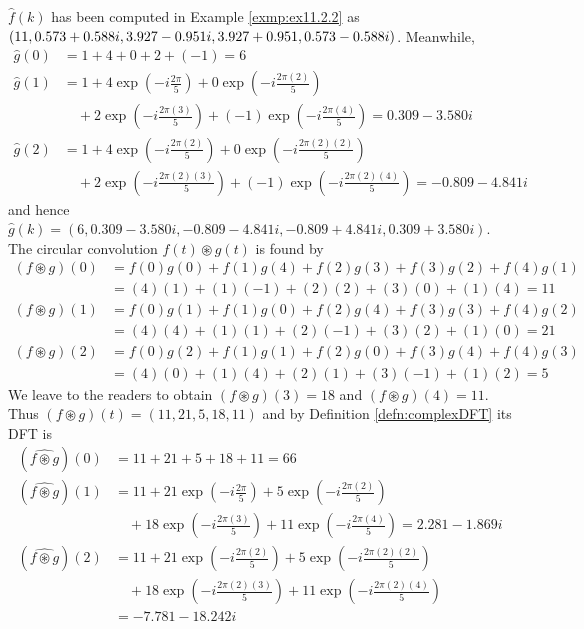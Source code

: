 \begin{solution}
$\hat{f}(k)$ has been computed in Example \ref{exmp:ex11.2.2} as $(11, 0.573+0.588i, \\ 3.927-0.951i, 3.927+0.951, 0.573-0.588i)$. Meanwhile,
\begin{align*}
\hat{g}(0) &= 1+4+0+2+(-1) = 6 \\
\hat{g}(1) &= 1 + 4\exp(-i\frac{2\pi}{5}) + 0\exp(-i\frac{2\pi(2)}{5}) \\
&\quad + 2\exp(-i\frac{2\pi(3)}{5}) + (-1)\exp(-i\frac{2\pi(4)}{5}) = 0.309-3.580i \\
\hat{g}(2) &= 1 + 4\exp(-i\frac{2\pi(2)}{5}) + 0\exp(-i\frac{2\pi(2)(2)}{5}) \\
&\quad+ 2\exp(-i\frac{2\pi(2)(3)}{5}) + (-1)\exp(-i\frac{2\pi(2)(4)}{5}) = -0.809 - 4.841i
\end{align*}
and hence $\hat{g}(k) = (6, 0.309-3.580i, -0.809-4.841i, -0.809+4.841i, 0.309+3.580i)$. The circular convolution $f(t) \circledast g(t)$ is found by
\begin{align*}
(f \circledast g)(0) &= f(0)g(0) + f(1)g(4) + f(2)g(3) + f(3)g(2) + f(4)g(1) \\
&= (4)(1) + (1)(-1) + (2)(2) + (3)(0) + (1)(4) = 11 \\
(f \circledast g)(1) &= f(0)g(1) + f(1)g(0) + f(2)g(4) + f(3)g(3) + f(4)g(2) \\
&= (4)(4) + (1)(1) + (2)(-1) + (3)(2) + (1)(0) = 21 \\
(f \circledast g)(2) &= f(0)g(2) + f(1)g(1) + f(2)g(0) + f(3)g(4) + f(4)g(3) \\
&= (4)(0) + (1)(4) + (2)(1) + (3)(-1) + (1)(2) = 5
\end{align*}
We leave to the readers to obtain $(f \circledast g)(3) = 18$ and $(f \circledast g)(4) = 11$. Thus $(f \circledast g)(t) = (11, 21, 5, 18, 11)$ and by Definition \ref{defn:complexDFT} its DFT is
\begin{align*}
(\widehat{f \circledast g})(0) &= 11+21+5+18+11 = 66 \\
(\widehat{f \circledast g})(1) &= 11 + 21\exp(-i\frac{2\pi}{5}) + 5\exp(-i\frac{2\pi(2)}{5}) \\
&\quad + 18\exp(-i\frac{2\pi(3)}{5}) + 11\exp(-i\frac{2\pi(4)}{5}) = 2.281 - 1.869i \\
(\widehat{f \circledast g})(2) &= 11 + 21\exp(-i\frac{2\pi(2)}{5}) + 5\exp(-i\frac{2\pi(2)(2)}{5}) \\
&\quad+ 18\exp(-i\frac{2\pi(2)(3)}{5}) + 11\exp(-i\frac{2\pi(2)(4)}{5}) \\
&= -7.781 - 18.242i

\end{align*}
\end{solution}
